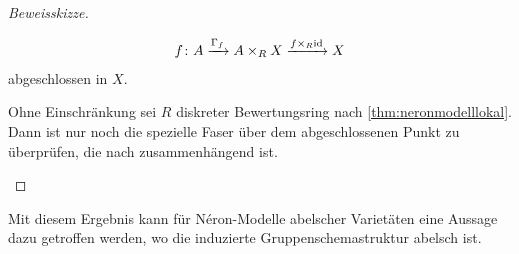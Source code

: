 \begin{Satz}
\begin{proof}[Beweisskizze]
\begin{description}[font=\normalfont\itshape]
\begin{gather*}
        f\colon A\xrightarrow{\Gamma_f} A\times_R X
        \xrightarrow{f\times_R\mathrm{id}} X
      \end{gather*}
      abgeschlossen in $X$.
    \item[$A$ hat zusammenhängende Fasern:]
      Ohne Einschränkung sei $R$ diskreter Bewertungsring nach
      \ref{thm:neronmodelllokal}.
      Dann ist nur noch die spezielle Faser über dem abgeschlossenen
      Punkt zu überprüfen, die nach \cite[{}5.5.1]{EGAIII-1} zusammenhängend
      ist.
      \qedhere
    \end{description}
  \end{proof}
\end{Satz}

Mit diesem Ergebnis kann für Néron-Modelle abelscher Varietäten
eine Aussage dazu getroffen werden, wo die induzierte
Gruppenschemastruktur abelsch ist.
